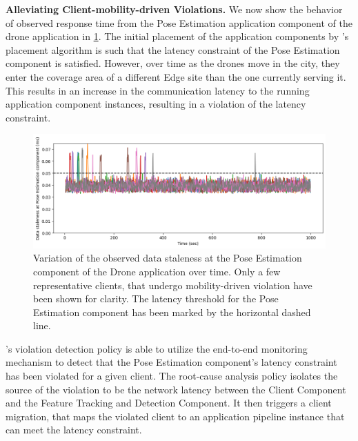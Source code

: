 \par \noindent \textbf{Alleviating Client-mobility-driven Violations.} We now show the behavior of observed response time from the Pose Estimation application component of the drone application in \cref{fig:drone_latencies}. The initial placement of the application components by \oneedge{}'s placement algorithm is such that the latency constraint of the Pose Estimation component is satisfied. However, over time as the drones move in the city, they enter the coverage area of a different Edge site than the one currently serving it. This results in an increase in the communication latency to the running application component instances, resulting in a violation of the latency constraint. 
\begin{figure}[ht]
  \centering
    \includegraphics[width=0.8\columnwidth]{figures/oneedge/drone_latencies.png}
    \caption{Variation of the observed data staleness at the Pose Estimation component of the Drone application over time. Only a few representative clients, that undergo mobility-driven violation have been shown for clarity. The latency threshold for the Pose Estimation component has been marked by the horizontal dashed line.}
    \label{fig:drone_latencies}
\end{figure}
\par \oneedge{}'s violation detection policy is able to utilize the end-to-end monitoring mechanism to detect that the Pose Estimation component's latency constraint has been violated for a given client. The root-cause analysis policy isolates the source of the violation to be the network latency between the Client Component and the Feature Tracking and Detection Component. It then triggers a client migration, that maps the violated client to an application pipeline instance that can meet the latency constraint.\\

